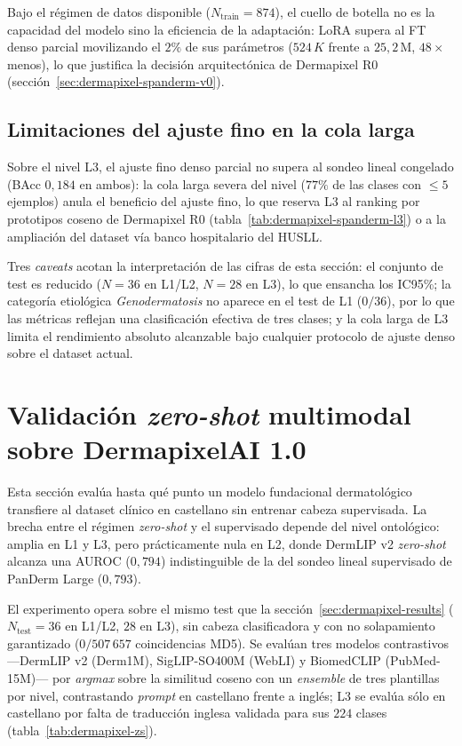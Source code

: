 Bajo el régimen de datos disponible ($N_{\mathrm{train}} = 874$), el
cuello de botella no es la capacidad del modelo sino la eficiencia de
la adaptación: LoRA supera al FT denso parcial movilizando el $2\%$ de
sus parámetros ($524\,K$ frente a $25{,}2$\,M, $48\times$ menos), lo
que justifica la decisión arquitectónica de Dermapixel R0
(sección~\ref{sec:dermapixel-spanderm-v0}).

\subsection{Limitaciones del ajuste fino en la cola larga}

Sobre el nivel L3, el ajuste fino denso parcial no supera al sondeo
lineal congelado (BAcc $0{,}184$ en ambos): la cola larga severa del
nivel ($77\%$ de las clases con $\leq 5$ ejemplos) anula el beneficio
del ajuste fino, lo que reserva L3 al ranking por prototipos coseno de
Dermapixel R0 (tabla~\ref{tab:dermapixel-spanderm-l3}) o a la
ampliación del dataset vía banco hospitalario del HUSLL.

Tres \emph{caveats} acotan la interpretación de las cifras de esta
sección: el conjunto de test es reducido ($N = 36$ en L1/L2,
$N = 28$ en L3), lo que ensancha los IC95\%; la categoría etiológica
\emph{Genodermatosis} no aparece en el test de L1 ($0 / 36$), por lo
que las métricas reflejan una clasificación efectiva de tres clases;
y la cola larga de L3 limita el rendimiento absoluto alcanzable bajo
cualquier protocolo de ajuste denso sobre el dataset actual.

\section{Validación \emph{zero-shot} multimodal sobre DermapixelAI 1.0}
\label{sec:dermapixel-zs}

Esta sección evalúa hasta qué punto un modelo fundacional
dermatológico transfiere al dataset clínico en castellano sin entrenar
cabeza supervisada. La brecha entre el régimen \emph{zero-shot} y el
supervisado depende del nivel ontológico: amplia en L1 y L3, pero
prácticamente nula en L2, donde DermLIP v2 \emph{zero-shot} alcanza
una AUROC ($0{,}794$) indistinguible de la del sondeo lineal
supervisado de PanDerm Large ($0{,}793$).

El experimento opera sobre el mismo test que la
sección~\ref{sec:dermapixel-results} ($N_{\mathrm{test}} = 36$ en
L1/L2, $28$ en L3), sin cabeza clasificadora y con no solapamiento
garantizado ($0 / 507\,657$ coincidencias MD5). Se evalúan tres
modelos contrastivos ---DermLIP v2 (Derm1M), SigLIP-SO400M (WebLI) y
BiomedCLIP (PubMed-15M)--- por \emph{argmax} sobre la similitud coseno
con un \emph{ensemble} de tres plantillas por nivel, contrastando
\emph{prompt} en castellano frente a inglés; L3 se evalúa sólo en
castellano por falta de traducción inglesa validada para sus $224$
clases (tabla~\ref{tab:dermapixel-zs}).

